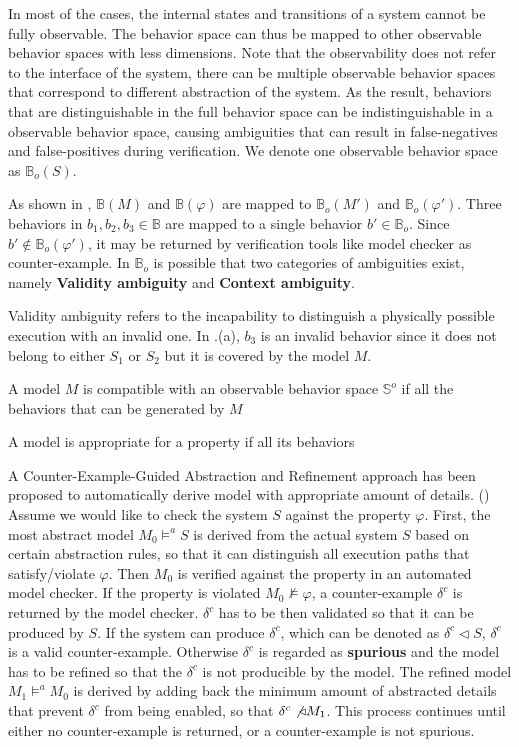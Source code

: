 In most of the cases, the internal states and transitions of a system cannot be fully observable. The behavior space can thus be mapped to other observable behavior spaces with less dimensions.
Note that the observability does not refer to the interface of the system, there can be multiple observable behavior spaces that correspond to different abstraction of the system. As the result, behaviors that are distinguishable in the full behavior space can be indistinguishable in a observable behavior space, causing ambiguities that can result in false-negatives and false-positives during verification. We denote one observable behavior space as $\mathbb{B}_o(S)$. 

As shown in , $\mathbb{B}(M)$ and $\mathbb{B}(\varphi)$ are mapped to $\mathbb{B}_o(M')$ and $\mathbb{B}_o(\varphi')$. Three behaviors in $b_1,b_2,b_3\in\mathbb{B}$ are mapped to a single behavior $b'\in\mathbb{B}_o$. Since $b'\not\in\mathbb{B}_o(\varphi')$, it may be returned by verification tools like model checker as counter-example. In $\mathbb{B}_o$ is possible that two categories of ambiguities exist, namely \textbf{Validity ambiguity} and \textbf{Context ambiguity}. %

Validity ambiguity refers to the incapability to distinguish a physically possible execution with an invalid one. In .(a), $b_3$ is an invalid behavior since it does not belong to either $S_1$ or $S_2$ but it is covered by the model $M$. 

A model $M$ is compatible with an observable behavior space $\mathbb{S}^o$ if all the behaviors that can be generated by $M$ 

A model is appropriate for a property if all its behaviors  



A Counter-Example-Guided Abstraction and Refinement approach has been proposed to automatically derive model with appropriate amount of details. (\cite{CEGAR}) Assume we would like to check the system $S$ against the property $\varphi$. First, the most abstract model $M_0\models^a S$ is derived from the actual system $S$ based on certain abstraction rules, so that it can distinguish all execution paths that satisfy/violate $\varphi$. Then $M_0$ is verified against the property in an automated model checker. If the property is violated $M_0\not\models\varphi$, a counter-example $\delta^c$ is returned by the model checker. $\delta^c$ has to be then validated so that it can be produced by $S$. If the system can produce $\delta^c$, which can be denoted as $\delta^c\triangleleft S$, $\delta^c$ is a valid counter-example. Otherwise $\delta^c$ is regarded as \textbf{spurious} and the model has to be refined so that the $\delta^c$ is not producible by the model. The refined model $M_1\models^a M_0$ is derived by adding back the minimum amount of abstracted details that prevent $\delta^c$ from being enabled, so that $\delta^c\not\triangleleft M_1$. This process continues until either no counter-example is returned, or a counter-example is not spurious. 

